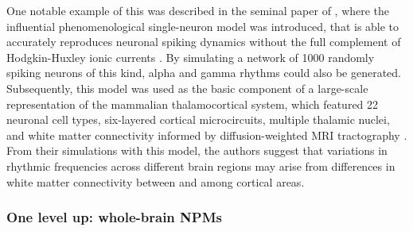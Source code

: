 \documentclass[12pt,twoside]{article}
\begin{document}
One notable example of this was described in the seminal paper of \citet{izhikevich2003simple}, where the influential phenomenological single-neuron model was introduced, that is able to accurately reproduces neuronal spiking dynamics without the full complement of Hodgkin-Huxley ionic currents \citep{izhikevich2003simple}. By simulating a network of 1000 randomly spiking neurons of this kind, alpha and gamma rhythms could also be generated. Subsequently, this model was used as the basic component of a large-scale representation of the mammalian thalamocortical system, which featured 22 neuronal cell types, six-layered cortical microcircuits, multiple thalamic nuclei, and white matter connectivity informed by diffusion-weighted MRI tractography \citep{izhikevich2008large}. From their simulations with this model, the authors suggest that variations in rhythmic frequencies across different brain regions may arise from differences in white matter connectivity between and among cortical areas. 






\subsubsection{One level up: whole-brain NPMs}
\end{document}
